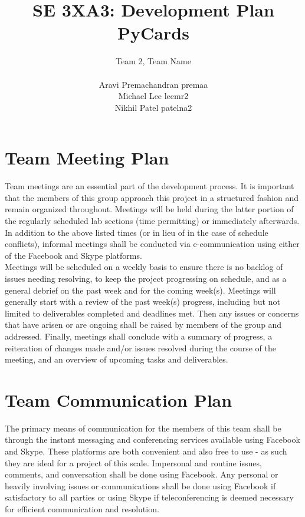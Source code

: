 \documentclass{article}
\title{SE 3XA3: Development Plan\\PyCards}
\author{Team 2, Team Name \\ \\ Aravi Premachandran premaa \\ Michael Lee leemr2 \\
Nikhil Patel patelna2 }
\date{}
\begin{document}
\maketitle


\section{Team Meeting Plan}

\noindent Team meetings are an essential part of the development process. It is
important that the members of this group approach this project in a structured
fashion and remain organized throughout. Meetings will be held during the latter
portion of the regularly scheduled lab sections (time permitting) or immediately
afterwards. In addition to the above listed times (or in lieu of in the case of
schedule conflicts), informal meetings shall be conducted via e-communication
using either of the Facebook and Skype platforms.\\Meetings will be scheduled on
a weekly basis to ensure there is no backlog of issues needing resolving, to
keep the project progressing on schedule, and as a general debrief on the past
week and for the coming week(s). Meetings will generally start with a review of
the past week(s) progress, including but not limited to deliverables completed
and deadlines met. Then any issues or concerns that have arisen or are ongoing
shall be raised by members of the group and addressed. Finally, meetings shall
conclude with a summary of progress, a reiteration of changes made and/or issues
resolved during the course of the meeting, and an overview of upcoming tasks and
deliverables.

\section{Team Communication Plan}

\noindent The primary means of communication for the members of this team shall
be through the instant messaging and conferencing services available using
Facebook and Skype. These platforms are both convenient and also free to use -
as such they are ideal for a project of this scale. Impersonal and routine
issues, comments, and conversation shall be done using Facebook. Any personal or
heavily involving issues or communications shall be done using Facebook if
satisfactory to all parties or using Skype if teleconferencing is deemed
necessary for efficient communication and resolution.
\end{document}
